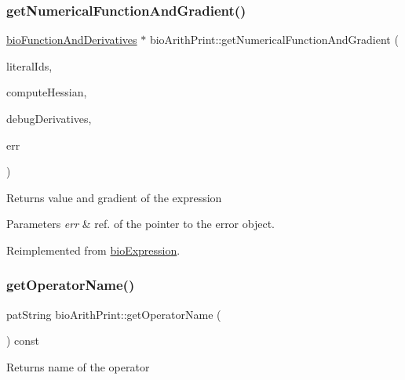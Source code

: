 \subsubsection{\texorpdfstring{get\+Numerical\+Function\+And\+Gradient()}{getNumericalFunctionAndGradient()}}
{\footnotesize\ttfamily \hyperlink{classbio_function_and_derivatives}{bio\+Function\+And\+Derivatives} $\ast$ bio\+Arith\+Print\+::get\+Numerical\+Function\+And\+Gradient (\begin{DoxyParamCaption}\item[{vector$<$ pat\+U\+Long $>$}]{literal\+Ids,  }\item[{pat\+Boolean}]{compute\+Hessian,  }\item[{pat\+Boolean}]{debug\+Derivatives,  }\item[{pat\+Error $\ast$\&}]{err }\end{DoxyParamCaption})\hspace{0.3cm}{\ttfamily [virtual]}}

\begin{DoxyReturn}{Returns}
value and gradient of the expression 
\end{DoxyReturn}

\begin{DoxyParams}{Parameters}
{\em err} & ref. of the pointer to the error object. \\
\hline
\end{DoxyParams}


Reimplemented from \hyperlink{classbio_expression_a91c81ce80c9e972c913b10f5f3c1ed13}{bio\+Expression}.

\mbox{\label{classbio_arith_print_a9451ac16baf5f060beafb2addb54a71e}} 
\subsubsection{\texorpdfstring{get\+Operator\+Name()}{getOperatorName()}}
{\footnotesize\ttfamily pat\+String bio\+Arith\+Print\+::get\+Operator\+Name (\begin{DoxyParamCaption}{ }\end{DoxyParamCaption}) const\hspace{0.3cm}{\ttfamily [virtual]}}

\begin{DoxyReturn}{Returns}
name of the operator 
\end{DoxyReturn}


